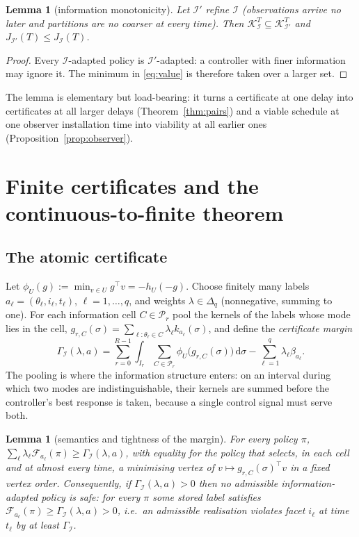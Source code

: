 \documentclass[11pt,a4paper]{article}
\theoremstyle{plain}
\newtheorem{lemma}[theorem]{Lemma}
\theoremstyle{definition}
\theoremstyle{remark}
\newcommand{\calI}{\mathcal{I}}
\newcommand{\calP}{\mathcal{P}}
\newcommand{\calK}{\mathcal{K}}
\newcommand{\calF}{\mathcal{F}}
\newcommand{\J}{J_{\calI}(T)}
\newcommand{\Gam}{\Gamma_{\calI}}
\newcommand{\dd}{\,\mathrm{d}}
\begin{document}
\begin{lemma}[information monotonicity]\label{lem:mono}
Let $\calI'$ refine $\calI$ (observations arrive no later and partitions are no coarser at every time). Then $\calK^T_\calI\subseteq\calK^T_{\calI'}$ and $J_{\calI'}(T)\le\J$.
\end{lemma}

\begin{proof}
Every $\calI$-adapted policy is $\calI'$-adapted: a controller with finer information may ignore it. The minimum in \eqref{eq:value} is therefore taken over a larger set.
\end{proof}

The lemma is elementary but load-bearing: it turns a certificate at one delay into certificates at all larger delays (Theorem~\ref{thm:pairs}) and a viable schedule at one observer installation time into viability at all earlier ones (Proposition~\ref{prop:observer}).
\section{Finite certificates and the continuous-to-finite theorem}\label{sec:certificates}

\subsection{The atomic certificate}

Let $\phi_U(g):=\min_{v\in U}g^\top v=-h_U(-g)$. Choose finitely many labels $a_\ell=(\theta_\ell,i_\ell,t_\ell)$, $\ell=1,\dots,q$, and weights $\lambda\in\Delta_q$ (nonnegative, summing to one). For each information cell $C\in\calP_r$ pool the kernels of the labels whose mode lies in the cell, $g_{r,C}(\sigma)=\sum_{\ell:\theta_\ell\in C}\lambda_\ell k_{a_\ell}(\sigma)$, and define the \emph{certificate margin}
\begin{equation}\label{eq:margin}
\Gam(\lambda,a)=\sum_{r=0}^{R-1}\int_{I_r}\sum_{C\in\calP_r}\phi_U\bigl(g_{r,C}(\sigma)\bigr)\dd\sigma-\sum_{\ell=1}^q\lambda_\ell\beta_{a_\ell}.
\end{equation}
The pooling is where the information structure enters: on an interval during which two modes are indistinguishable, their kernels are summed before the controller's best response is taken, because a single control signal must serve both.

\begin{lemma}[semantics and tightness of the margin]\label{lem:semantics}
For every policy $\pi$, $\sum_\ell\lambda_\ell\calF_{a_\ell}(\pi)\ge\Gam(\lambda,a)$, with equality for the policy that selects, in each cell and at almost every time, a minimising vertex of $v\mapsto g_{r,C}(\sigma)^\top v$ in a fixed vertex order. Consequently, if $\Gam(\lambda,a)>0$ then no admissible information-adapted policy is safe: for every $\pi$ some stored label satisfies $\calF_{a_\ell}(\pi)\ge\Gam(\lambda,a)>0$, i.e.\ an admissible realisation violates facet $i_\ell$ at time $t_\ell$ by at least $\Gam$.
\end{lemma}
\end{document}
